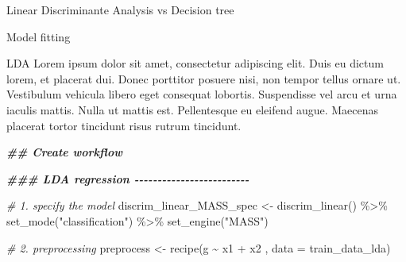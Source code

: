 \documentclass[
  ignorenonframetext,
]{article}
\newenvironment{Shaded}{\begin{snugshade}}{\end{snugshade}}
\newcommand{\AttributeTok}[1]{\textcolor[rgb]{0.77,0.63,0.00}{#1}}
\newcommand{\CommentTok}[1]{\textcolor[rgb]{0.56,0.35,0.01}{\textit{#1}}}
\newcommand{\DocumentationTok}[1]{\textcolor[rgb]{0.56,0.35,0.01}{\textbf{\textit{#1}}}}
\newcommand{\FloatTok}[1]{\textcolor[rgb]{0.00,0.00,0.81}{#1}}
\newcommand{\FunctionTok}[1]{\textcolor[rgb]{0.00,0.00,0.00}{#1}}
\newcommand{\NormalTok}[1]{#1}
\newcommand{\OtherTok}[1]{\textcolor[rgb]{0.56,0.35,0.01}{#1}}
\newcommand{\SpecialCharTok}[1]{\textcolor[rgb]{0.00,0.00,0.00}{#1}}
\newcommand{\StringTok}[1]{\textcolor[rgb]{0.31,0.60,0.02}{#1}}
\begin{document}
\begin{frame}[fragile]{Linear Discriminante Analysis vs Decision tree}
\begin{block}{Model fitting}
\begin{Shaded}
\end{Shaded}

\begin{block}{LDA}
\protect\hypertarget{lda}{}
Lorem ipsum dolor sit amet, consectetur adipiscing elit. Duis eu dictum lorem, et placerat dui. Donec porttitor posuere nisi, non tempor tellus ornare ut. Vestibulum vehicula libero eget consequat lobortis. Suspendisse vel arcu et urna iaculis mattis. Nulla ut mattis est. Pellentesque eu eleifend augue. Maecenas placerat tortor tincidunt risus rutrum tincidunt.

\begin{Shaded}
\begin{Highlighting}[]
\DocumentationTok{\#\# Create workflow}

\DocumentationTok{\#\#\# LDA regression {-}{-}{-}{-}{-}{-}{-}{-}{-}{-}{-}{-}{-}{-}{-}{-}{-}{-}{-}{-}{-}{-}{-}{-}{-}}


\CommentTok{\# 1. specify the model}
\NormalTok{discrim\_linear\_MASS\_spec }\OtherTok{\textless{}{-}}
  \FunctionTok{discrim\_linear}\NormalTok{() }\SpecialCharTok{\%\textgreater{}\%}
  \FunctionTok{set\_mode}\NormalTok{(}\StringTok{"classification"}\NormalTok{) }\SpecialCharTok{\%\textgreater{}\%}
  \FunctionTok{set\_engine}\NormalTok{(}\StringTok{"MASS"}\NormalTok{)}


\CommentTok{\# 2. preprocessing }
\NormalTok{preprocess }\OtherTok{\textless{}{-}} 
  \FunctionTok{recipe}\NormalTok{(g }\SpecialCharTok{\textasciitilde{}}\NormalTok{ x1 }\SpecialCharTok{+}\NormalTok{ x2 , }\AttributeTok{data =}\NormalTok{ train\_data\_lda)}
  

\end{Highlighting}
\end{Shaded}
\end{block}
\end{block}
\end{frame}
\end{document}
